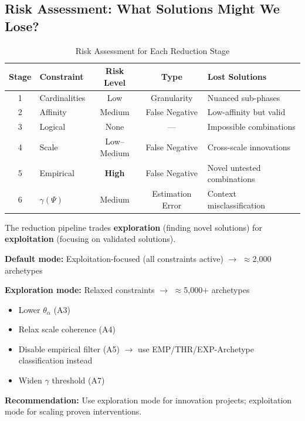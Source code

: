 \subsection{Risk Assessment: What Solutions Might We Lose?}

\begin{table}[htbp]
\centering
\caption{Risk Assessment for Each Reduction Stage}
\label{tab:17-risk-assessment}
\renewcommand{\arraystretch}{1.3}
\small
\begin{tabular}{@{}clccp{4cm}@{}}
\toprule
\textbf{Stage} & \textbf{Constraint} & \textbf{Risk Level} & \textbf{Type} & \textbf{Lost Solutions} \\
\midrule
1 & Cardinalities & Low & Granularity & Nuanced sub-phases \\
2 & Affinity & Medium & False Negative & Low-affinity but valid \\
3 & Logical & \textcolor{green!60!black}{None} & --- & Impossible combinations \\
4 & Scale & Low--Medium & False Negative & Cross-scale innovations \\
5 & Empirical & \textcolor{red!60!black}{\textbf{High}} & False Negative & Novel untested combinations \\
6 & $\gamma(\Psi)$ & Medium & Estimation Error & Context misclassification \\
\bottomrule
\end{tabular}
\end{table}

\begin{tcolorbox}[colback=blue!5!white, colframe=blue!75!black,
    title=Key Insight: The Exploration-Exploitation Tradeoff]

The reduction pipeline trades \textbf{exploration} (finding novel solutions) for \textbf{exploitation} (focusing on validated solutions).

\textbf{Default mode:} Exploitation-focused (all constraints active) $\rightarrow$ $\approx$2,000 archetypes

\textbf{Exploration mode:} Relaxed constraints $\rightarrow$ $\approx$5,000+ archetypes
\begin{itemize}[nosep]
\item Lower $\theta_\alpha$ (A3)
\item Relax scale coherence (A4)
\item Disable empirical filter (A5) $\rightarrow$ use EMP/THR/EXP-Archetype classification instead
\item Widen $\gamma$ threshold (A7)
\end{itemize}

\textbf{Recommendation:} Use exploration mode for innovation projects; exploitation mode for scaling proven interventions.
\end{tcolorbox}

